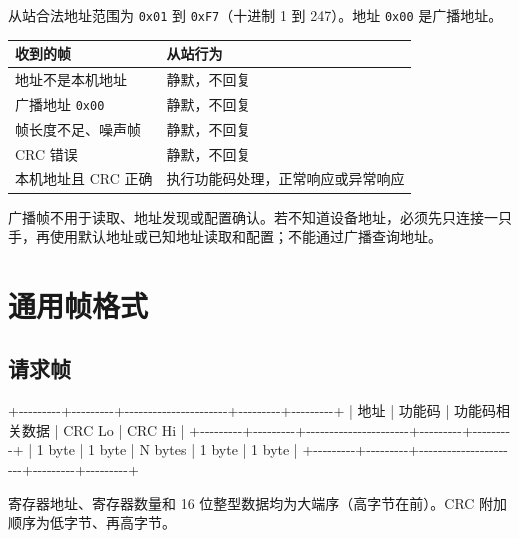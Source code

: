 \documentclass[
  chinese,
]{ctexart}
\newenvironment{Shaded}{}{}
\newcommand{\NormalTok}[1]{#1}
\newcounter{none} %
\begin{document}
从站合法地址范围为 \texttt{0x01} 到 \texttt{0xF7}（十进制 1 到
247）。地址 \texttt{0x00} 是广播地址。

{\def\LTcaptype{none} %
\begin{longtable}[]{@{}ll@{}}
\toprule\noalign{}
收到的帧 & 从站行为 \\
\midrule\noalign{}
\endhead
\bottomrule\noalign{}
\endlastfoot
地址不是本机地址 & 静默，不回复 \\
广播地址 \texttt{0x00} & 静默，不回复 \\
帧长度不足、噪声帧 & 静默，不回复 \\
CRC 错误 & 静默，不回复 \\
本机地址且 CRC 正确 & 执行功能码处理，正常响应或异常响应 \\
\end{longtable}
}

广播帧不用于读取、地址发现或配置确认。若不知道设备地址，必须先只连接一只手，再使用默认地址或已知地址读取和配置；不能通过广播查询地址。

\section{通用帧格式}\label{ux901aux7528ux5e27ux683cux5f0f}

\subsection{请求帧}\label{ux8bf7ux6c42ux5e27}

\begin{Shaded}
\begin{Highlighting}[]
\NormalTok{+{-}{-}{-}{-}{-}{-}{-}{-}{-}+{-}{-}{-}{-}{-}{-}{-}{-}{-}+{-}{-}{-}{-}{-}{-}{-}{-}{-}{-}{-}{-}{-}{-}{-}{-}{-}{-}{-}{-}{-}{-}+{-}{-}{-}{-}{-}{-}{-}{-}{-}+{-}{-}{-}{-}{-}{-}{-}{-}{-}+}
\NormalTok{| 地址    | 功能码  | 功能码相关数据       | CRC Lo  | CRC Hi  |}
\NormalTok{+{-}{-}{-}{-}{-}{-}{-}{-}{-}+{-}{-}{-}{-}{-}{-}{-}{-}{-}+{-}{-}{-}{-}{-}{-}{-}{-}{-}{-}{-}{-}{-}{-}{-}{-}{-}{-}{-}{-}{-}{-}+{-}{-}{-}{-}{-}{-}{-}{-}{-}+{-}{-}{-}{-}{-}{-}{-}{-}{-}+}
\NormalTok{| 1 byte  | 1 byte  | N bytes              | 1 byte  | 1 byte  |}
\NormalTok{+{-}{-}{-}{-}{-}{-}{-}{-}{-}+{-}{-}{-}{-}{-}{-}{-}{-}{-}+{-}{-}{-}{-}{-}{-}{-}{-}{-}{-}{-}{-}{-}{-}{-}{-}{-}{-}{-}{-}{-}{-}+{-}{-}{-}{-}{-}{-}{-}{-}{-}+{-}{-}{-}{-}{-}{-}{-}{-}{-}+}
\end{Highlighting}
\end{Shaded}

寄存器地址、寄存器数量和 16 位整型数据均为大端序（高字节在前）。CRC
附加顺序为低字节、再高字节。
\end{document}
